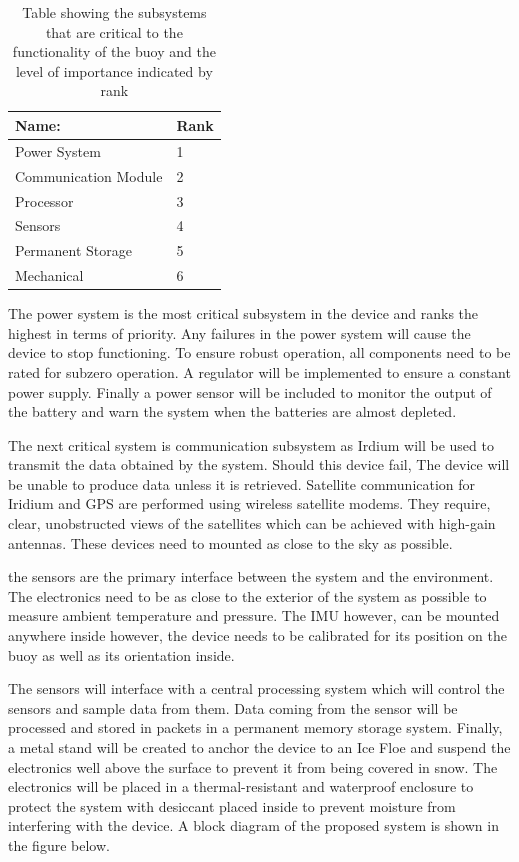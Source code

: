 \begin{table}[H]
    \centering
    \caption{Table showing the subsystems that are critical to the functionality of the buoy and the level of importance indicated by rank}
    \begin{tabular}{|l| l |}
    \hline
    Name:  & Rank\\
    \hline
    Power System & 1 \\
    \hline
    Communication Module  & 2\\
    \hline
    Processor & 3\\
    \hline
    Sensors & 4\\
    \hline
    Permanent Storage  & 5 \\
    \hline
    Mechanical & 6 \\
    \hline
    \end{tabular}

    \label{tab:subsys}
\end{table}

The power system is the most critical subsystem in the device and ranks the highest in terms of priority. Any failures in the power system will cause the device to stop functioning. To ensure robust operation, all components need to be rated for subzero operation. A regulator will be implemented to ensure a constant power supply. Finally a power sensor will be included to monitor the output of the battery and warn the system when the batteries are almost depleted. \par 

The next critical system is communication subsystem as Irdium will be used to transmit the data obtained by the system. Should this device fail, The device will be unable to produce data unless it is retrieved. Satellite communication for Iridium and GPS are performed using wireless satellite modems. They require, clear, unobstructed views of the satellites which can be achieved with high-gain antennas. These devices need to mounted as close to the sky as possible.\par
the sensors are the primary interface between the system and the environment. The electronics need to be as close to the exterior of the system as possible to measure ambient temperature and pressure. The IMU however, can be mounted anywhere inside however, the device needs to be calibrated for its position on the buoy as well as its orientation inside. \par 

The sensors will interface with a central processing system which will control the sensors and sample data from them. Data coming from the sensor will be processed and stored in packets in a permanent memory storage system. Finally, a metal stand will be created to anchor the device to an Ice Floe and suspend the electronics well above the surface to prevent it from being covered in snow. The electronics will be placed in a thermal-resistant and waterproof enclosure to protect the system with desiccant placed inside to prevent moisture from interfering with the device. A block diagram of the proposed system is shown in the figure below.

